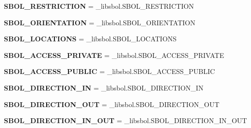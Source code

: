 \begin{DoxyCompactItemize}
\item 
{\bfseries S\+B\+O\+L\+\_\+\+R\+E\+S\+T\+R\+I\+C\+T\+I\+ON} = \+\_\+libsbol.\+S\+B\+O\+L\+\_\+\+R\+E\+S\+T\+R\+I\+C\+T\+I\+ON\hypertarget{namespacesbol_1_1libsbol_a94a0504cdfcadf203a361d8cf32a0ef0}{}\label{namespacesbol_1_1libsbol_a94a0504cdfcadf203a361d8cf32a0ef0}

\item 
{\bfseries S\+B\+O\+L\+\_\+\+O\+R\+I\+E\+N\+T\+A\+T\+I\+ON} = \+\_\+libsbol.\+S\+B\+O\+L\+\_\+\+O\+R\+I\+E\+N\+T\+A\+T\+I\+ON\hypertarget{namespacesbol_1_1libsbol_ab4368d2add034bb5b2d7f5f214e037b0}{}\label{namespacesbol_1_1libsbol_ab4368d2add034bb5b2d7f5f214e037b0}

\item 
{\bfseries S\+B\+O\+L\+\_\+\+L\+O\+C\+A\+T\+I\+O\+NS} = \+\_\+libsbol.\+S\+B\+O\+L\+\_\+\+L\+O\+C\+A\+T\+I\+O\+NS\hypertarget{namespacesbol_1_1libsbol_afcabc7b53cbf22135c1084e6e81a3191}{}\label{namespacesbol_1_1libsbol_afcabc7b53cbf22135c1084e6e81a3191}

\item 
{\bfseries S\+B\+O\+L\+\_\+\+A\+C\+C\+E\+S\+S\+\_\+\+P\+R\+I\+V\+A\+TE} = \+\_\+libsbol.\+S\+B\+O\+L\+\_\+\+A\+C\+C\+E\+S\+S\+\_\+\+P\+R\+I\+V\+A\+TE\hypertarget{namespacesbol_1_1libsbol_a04acf7f10b85e4a508a0bccc59c472cc}{}\label{namespacesbol_1_1libsbol_a04acf7f10b85e4a508a0bccc59c472cc}

\item 
{\bfseries S\+B\+O\+L\+\_\+\+A\+C\+C\+E\+S\+S\+\_\+\+P\+U\+B\+L\+IC} = \+\_\+libsbol.\+S\+B\+O\+L\+\_\+\+A\+C\+C\+E\+S\+S\+\_\+\+P\+U\+B\+L\+IC\hypertarget{namespacesbol_1_1libsbol_a5c027751778286f31a4d2b72ed29078e}{}\label{namespacesbol_1_1libsbol_a5c027751778286f31a4d2b72ed29078e}

\item 
{\bfseries S\+B\+O\+L\+\_\+\+D\+I\+R\+E\+C\+T\+I\+O\+N\+\_\+\+IN} = \+\_\+libsbol.\+S\+B\+O\+L\+\_\+\+D\+I\+R\+E\+C\+T\+I\+O\+N\+\_\+\+IN\hypertarget{namespacesbol_1_1libsbol_a748fcd588107c826a5934006393235f1}{}\label{namespacesbol_1_1libsbol_a748fcd588107c826a5934006393235f1}

\item 
{\bfseries S\+B\+O\+L\+\_\+\+D\+I\+R\+E\+C\+T\+I\+O\+N\+\_\+\+O\+UT} = \+\_\+libsbol.\+S\+B\+O\+L\+\_\+\+D\+I\+R\+E\+C\+T\+I\+O\+N\+\_\+\+O\+UT\hypertarget{namespacesbol_1_1libsbol_a651d12ede372bfeaf25be00c6f69b16d}{}\label{namespacesbol_1_1libsbol_a651d12ede372bfeaf25be00c6f69b16d}

\item 
{\bfseries S\+B\+O\+L\+\_\+\+D\+I\+R\+E\+C\+T\+I\+O\+N\+\_\+\+I\+N\+\_\+\+O\+UT} = \+\_\+libsbol.\+S\+B\+O\+L\+\_\+\+D\+I\+R\+E\+C\+T\+I\+O\+N\+\_\+\+I\+N\+\_\+\+O\+UT\hypertarget{namespacesbol_1_1libsbol_ad3df546878cb4b178f8dd7766c528b15}{}\label{namespacesbol_1_1libsbol_ad3df546878cb4b178f8dd7766c528b15}


\end{DoxyCompactItemize}
